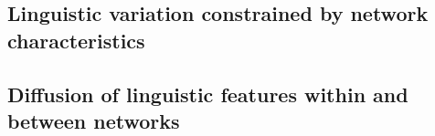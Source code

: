     \subsection{Linguistic variation constrained by network characteristics}
    \subsection{Diffusion of linguistic features within and between networks}
